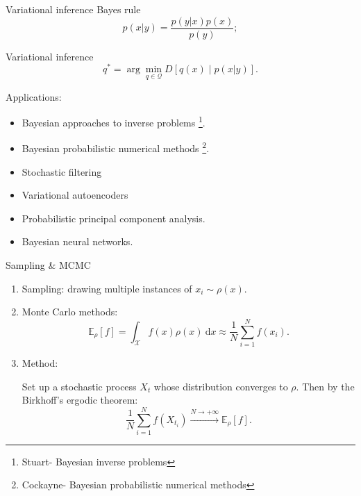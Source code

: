 \documentclass{beamer}
\newcommand{\E}{\mathbb E}
\renewcommand{\d}{\: \mathrm{d}}
\begin{document}
\begin{frame}{Variational inference}
Bayes rule
\begin{equation*}
    p(x | y) = \frac{p(y | x)p(x)}{p(y)};
\end{equation*}

Variational inference
\begin{equation*}
\label{eq: general divergence minimisation for variational inference}
    q^* = \arg \min_{q\in \mathcal Q} D[q(x) \mid p(x | y)].
\end{equation*}

Applications:
\small
\begin{itemize}
    \item Bayesian approaches to inverse problems \footnote{Stuart- Bayesian inverse problems}.
    \item Bayesian probabilistic numerical methods \footnote{Cockayne- Bayesian probabilistic numerical methods }.
    \item Stochastic filtering
    \item Variational autoencoders
    \item Probabilistic principal component analysis.
    \item Bayesian neural networks.
\end{itemize}
\end{frame}

\begin{frame}{Sampling \& MCMC}
\begin{enumerate}
    \item Sampling: drawing multiple instances of $ x_i \sim \rho(x).$
    \item Monte Carlo methods:
\begin{equation*}
    \E_\rho[f] = \int_\mathcal X f(x) \rho(x) \d x \approx \frac 1 N\sum_{i=1}^N f(x_i).
\end{equation*}
\item Method:

Set up a stochastic process $X_t$ whose distribution converges to $\rho$. Then by the Birkhoff's ergodic theorem:
\begin{equation*}
  \frac 1 N\sum_{i=1}^N f(X_{t_i}) \xrightarrow{N \to +\infty} \E_\rho[f].
\end{equation*}
\end{enumerate}
\end{frame}
\end{document}
